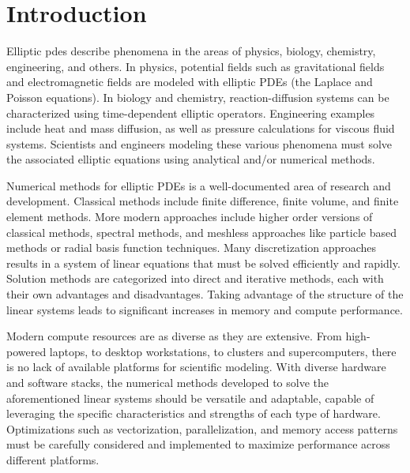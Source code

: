 \section{Introduction}

Elliptic \gls{pdes} describe phenomena in the areas of physics, biology, chemistry, engineering, and others. In physics, potential fields such as gravitational fields and electromagnetic fields are modeled with elliptic PDEs (the Laplace and Poisson equations). In biology and chemistry, reaction-diffusion systems can be characterized using time-dependent elliptic operators. Engineering examples include heat and mass diffusion, as well as pressure calculations for viscous fluid systems. Scientists and engineers modeling these various phenomena must solve the associated elliptic equations using analytical and/or numerical methods.

Numerical methods for elliptic PDEs is a well-documented area of research and development. Classical methods include finite difference, finite volume, and finite element methods. More modern approaches include higher order versions of classical methods, spectral methods, and meshless approaches like particle based methods or radial basis function techniques. Many discretization approaches results in a system of linear equations that must be solved efficiently and rapidly. Solution methods are categorized into direct and iterative methods, each with their own advantages and disadvantages. Taking advantage of the structure of the linear systems leads to significant increases in memory and compute performance.

Modern compute resources are as diverse as they are extensive. From high-powered laptops, to desktop workstations, to clusters and supercomputers, there is no lack of available platforms for scientific modeling. With diverse hardware and software stacks, the numerical methods developed to solve the aforementioned linear systems should be versatile and adaptable, capable of leveraging the specific characteristics and strengths of each type of hardware. Optimizations such as vectorization, parallelization, and memory access patterns must be carefully considered and implemented to maximize performance across different platforms.

